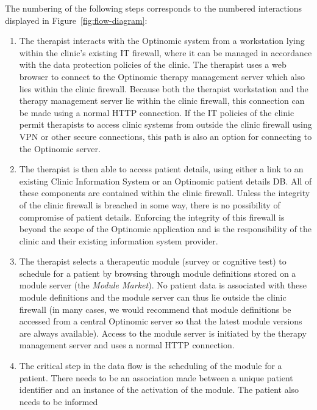 \documentclass[DIV=calc,paper=a4,fontsize=11pt,twocolumn]{scrartcl}
\begin{document}
The numbering of the following steps corresponds to the numbered
interactions displayed in Figure~\ref{fig:flow-diagram}:

\begin{enumerate}
  \item{The therapist interacts with the Optinomic system from a
    workstation lying within the clinic's existing IT firewall, where
    it can be managed in accordance with the data protection policies
    of the clinic.  The therapist uses a web browser to connect to the
    Optinomic therapy management server which also lies within the
    clinic firewall.  Because both the therapist workstation and the
    therapy management server lie within the clinic firewall, this
    connection can be made using a normal HTTP connection.  If the IT
    policies of the clinic permit therapists to access clinic systems
    from outside the clinic firewall using VPN or other secure
    connections, this path is also an option for connecting to the
    Optinomic server.}
  \item{The therapist is then able to access patient details, using
    either a link to an existing Clinic Information System or an
    Optinomic patient details DB.  All of these components are
    contained within the clinic firewall.  Unless the integrity of the
    clinic firewall is breached in some way, there is no possibility
    of compromise of patient details.  Enforcing the integrity of this
    firewall is beyond the scope of the Optinomic application and is
    the responsibility of the clinic and their existing information
    system provider.}
  \item{The therapist selects a therapeutic module (survey or
    cognitive test) to schedule for a patient by browsing through
    module definitions stored on a module server (the \emph{Module
      Market}).  No patient data is associated with these module
    definitions and the module server can thus lie outside the clinic
    firewall (in many cases, we would recommend that module
    definitions be accessed from a central Optinomic server so that
    the latest module versions are always available).  Access to the
    module server is initiated by the therapy management server and
    uses a normal HTTP connection.}
  \item{The critical step in the data flow is the scheduling of the
    module for a patient.  There needs to be an association made
    between a unique patient identifier and an instance of the
    activation of the module.  The patient also needs to be informed
}
\end{enumerate}
\end{document}
